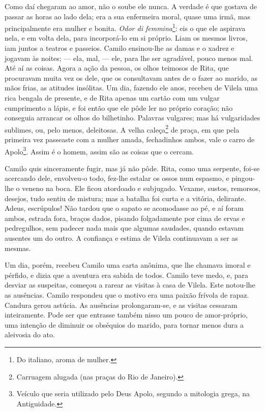 Como daí chegaram ao amor, não o soube ele nunca. A verdade é que
gostava de passar as horas ao lado dela; era a sua enfermeira moral,
quase uma irmã, mas principalmente era mulher e bonita. \emph{Odor di
femmina}\footnote{Do italiano, aroma de mulher.}: eis o que ele aspirava
nela, e em volta dela, para incorporá-lo em si próprio. Liam os mesmos
livros, iam juntos a teatros e passeios. Camilo ensinou-lhe as damas e o
xadrez e jogavam às noites; --- ela, mal, --- ele, para lhe ser agradável,
pouco menos mal. Até aí as coisas. Agora a ação da pessoa, os olhos
teimosos de Rita, que procuravam muita vez os dele, que os consultavam
antes de o fazer ao marido, as mãos frias, as atitudes insólitas. Um
dia, fazendo ele anos, recebeu de Vilela uma rica bengala de presente, e
de Rita apenas um cartão com um vulgar cumprimento a lápis, e foi então
que ele pôde ler no próprio coração; não conseguia arrancar os olhos do
bilhetinho. Palavras vulgares; mas há vulgaridades sublimes, ou, pelo
menos, deleitosas. A velha caleça\footnote{Carruagem alugada (nas praças
  do Rio de Janeiro).} de praça, em que pela primeira vez passeaste com
a mulher amada, fechadinhos ambos, vale o carro de Apolo\footnote{Veículo
  que seria utilizado pelo Deus Apolo, segundo a mitologia grega, na
  Antiguidade.}. Assim é o homem, assim são as coisas que o cercam.

Camilo quis sinceramente fugir, mas já não pôde. Rita, como uma
serpente, foi-se acercando dele, envolveu-o todo, fez-lhe estalar os
ossos num espasmo, e pingou-lhe o veneno na boca. Ele ficou atordoado e
subjugado. Vexame, sustos, remorsos, desejos, tudo sentiu de mistura;
mas a batalha foi curta e a vitória, delirante. Adeus, escrúpulos! Não
tardou que o sapato se acomodasse ao pé, e aí foram ambos, estrada fora,
braços dados, pisando folgadamente por cima de ervas e pedregulhos, sem
padecer nada mais que algumas saudades, quando estavam ausentes um do
outro. A confiança e estima de Vilela continuavam a ser as mesmas.

Um dia, porém, recebeu Camilo uma carta anônima, que lhe chamava imoral
e pérfido, e dizia que a aventura era sabida de todos. Camilo teve medo,
e, para desviar as suspeitas, começou a rarear as visitas à casa de
Vilela. Este notou-lhe as ausências. Camilo respondeu que o motivo era
uma paixão frívola de rapaz. Candura gerou astúcia. As ausências
prolongaram-se, e as visitas cessaram inteiramente. Pode ser que
entrasse também nisso um pouco de amor-próprio, uma intenção de diminuir
os obséquios do marido, para tornar menos dura a aleivosia do ato.


